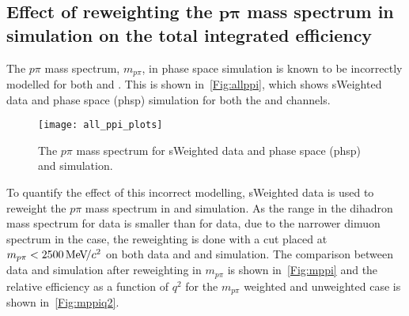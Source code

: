 


\subsection[Effect of reweighting the $p\pi$ mass  spectrum in simulation on the total integrated efficiency]{Effect of reweighting the $\mathbold{p\pi}$ mass  spectrum in simulation on the total integrated efficiency}
\label{sec:ppisys}
The $p\pi$ mass spectrum, $m_{p\pi}$, in phase space simulation is known to be incorrectly modelled for both \Lbpi and \Lbpijpsi. This is shown in~\autoref{Fig:allppi}, which shows sWeighted \Lbpijpsi data and phase space (phsp) simulation for both the \Lbpi and \Lbpijpsi channels.

\begin{figure}[h!]
  \centering
  \texttt{[image: all\_ppi\_plots]}
    \caption{The $p\pi$ mass spectrum for sWeighted \Lbpijpsi data and phase space (phsp) \Lbpi and \Lbpijpsi simulation.}
  \label{Fig:allppi}

  \end{figure}


To quantify the effect of this incorrect modelling, \Lbpijpsi sWeighted data is used to reweight the $p\pi$ mass spectrum in \Lbpi and \Lbpijpsi simulation. As the range in the dihadron mass spectrum for \Lbpijpsi data is smaller than for \Lbpi data, due to the narrower dimuon spectrum in the \Lbpijpsi case, the reweighting is done with a cut placed at $m_{p\pi}<2500{\mathrm{\,Me\kern -0.1em V\!/}c^2}$  on both \Lbpijpsi data and \Lbpi and \Lbpijpsi  simulation. The comparison between \Lbpijpsi data and \Lbpi simulation after reweighting in $m_{p\pi}$ is shown in~\autoref{Fig:mppi} and the relative efficiency as a function of $q^{2}$ for the $m_{p\pi}$ weighted and unweighted case is shown in~\autoref{Fig:mppiq2}.

